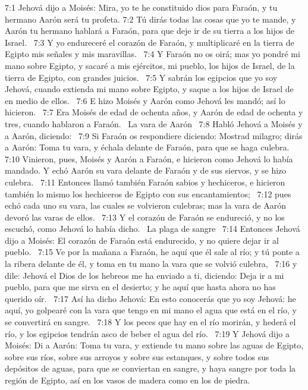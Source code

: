 7:1 Jehová dijo a Moisés: Mira, yo te he constituido dios para Faraón, y tu hermano Aarón será tu profeta. 
7:2 Tú dirás todas las cosas que yo te mande, y Aarón tu hermano hablará a Faraón, para que deje ir de su tierra a los hijos de Israel.  
7:3 Y yo endureceré el corazón de Faraón, y multiplicaré en la tierra de Egipto mis señales y mis maravillas.  
7:4 Y Faraón no os oirá; mas yo pondré mi mano sobre Egipto, y sacaré a mis ejércitos, mi pueblo, los hijos de Israel, de la tierra de Egipto, con grandes juicios.  
7:5 Y sabrán los egipcios que yo soy Jehová, cuando extienda mi mano sobre Egipto, y saque a los hijos de Israel de en medio de ellos.  
7:6 E hizo Moisés y Aarón como Jehová les mandó; así lo hicieron.  
7:7 Era Moisés de edad de ochenta años, y Aarón de edad de ochenta y tres, cuando hablaron a Faraón.  
La vara de Aarón  
7:8 Habló Jehová a Moisés y a Aarón, diciendo:  
7:9 Si Faraón os respondiere diciendo: Mostrad milagro; dirás a Aarón: Toma tu vara, y échala delante de Faraón, para que se haga culebra.  
7:10 Vinieron, pues, Moisés y Aarón a Faraón, e hicieron como Jehová lo había mandado. Y echó Aarón su vara delante de Faraón y de sus siervos, y se hizo culebra.  
7:11 Entonces llamó también Faraón sabios y hechiceros, e hicieron también lo mismo los hechiceros de Egipto con sus encantamientos;  
7:12 pues echó cada uno su vara, las cuales se volvieron culebras; mas la vara de Aarón devoró las varas de ellos.  
7:13 Y el corazón de Faraón se endureció, y no los escuchó, como Jehová lo había dicho.  
La plaga de sangre  
7:14 Entonces Jehová dijo a Moisés: El corazón de Faraón está endurecido, y no quiere dejar ir al pueblo.  
7:15 Ve por la mañana a Faraón, he aquí que él sale al río; y tú ponte a la ribera delante de él, y toma en tu mano la vara que se volvió culebra,  
7:16 y dile: Jehová el Dios de los hebreos me ha enviado a ti, diciendo: Deja ir a mi pueblo, para que me sirva en el desierto; y he aquí que hasta ahora no has querido oír.  
7:17 Así ha dicho Jehová: En esto conocerás que yo soy Jehová: he aquí, yo golpearé con la vara que tengo en mi mano el agua que está en el río, y se convertirá en sangre.  
7:18 Y los peces que hay en el río morirán, y hederá el río, y los egipcios tendrán asco de beber el agua del río.  
7:19 Y Jehová dijo a Moisés: Di a Aarón: Toma tu vara, y extiende tu mano sobre las aguas de Egipto, sobre sus ríos, sobre sus arroyos y sobre sus estanques, y sobre todos sus depósitos de aguas, para que se conviertan en sangre, y haya sangre por toda la región de Egipto, así en los vasos de madera como en los de piedra.  
